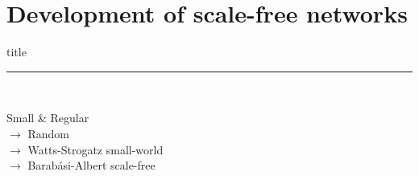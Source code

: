 \documentclass{beamer}
\begin{document}




\section{Development of scale-free networks}
\begin{frame}[plain]
  \vfill
  \centering
  \begin{beamercolorbox}[sep=8pt,center,shadow=true,rounded=true]{title}
    \insertsectionhead\par%
    \color{oxfordblue}\noindent\rule{10cm}{1pt} \\[1em]

    \centering
    \begin{flushleft}
      Small \& Regular \\
        $\rightarrow$ Random \\
        $\rightarrow$ Watts-Strogatz small-world \\
        $\rightarrow$ Barabási-Albert scale-free
    \end{flushleft}
  \end{beamercolorbox}
\end{frame}
\end{document}
